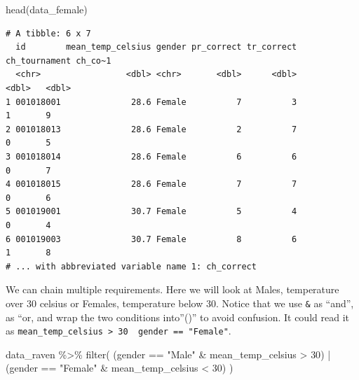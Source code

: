 \documentclass[
  letterpaper,
]{book}
\newenvironment{Shaded}{\begin{snugshade}}{\end{snugshade}}
\newcommand{\DecValTok}[1]{\textcolor[rgb]{0.68,0.00,0.00}{#1}}
\newcommand{\FunctionTok}[1]{\textcolor[rgb]{0.28,0.35,0.67}{#1}}
\newcommand{\NormalTok}[1]{\textcolor[rgb]{0.00,0.23,0.31}{#1}}
\newcommand{\SpecialCharTok}[1]{\textcolor[rgb]{0.37,0.37,0.37}{#1}}
\newcommand{\StringTok}[1]{\textcolor[rgb]{0.13,0.47,0.30}{#1}}
\begin{document}
\begin{Shaded}
\begin{Highlighting}[]
\FunctionTok{head}\NormalTok{(data\_female)}
\end{Highlighting}
\end{Shaded}

\begin{verbatim}
# A tibble: 6 x 7
  id        mean_temp_celsius gender pr_correct tr_correct ch_tournament ch_co~1
  <chr>                 <dbl> <chr>       <dbl>      <dbl>         <dbl>   <dbl>
1 001018001              28.6 Female          7          3             1       9
2 001018013              28.6 Female          2          7             0       5
3 001018014              28.6 Female          6          6             0       7
4 001018015              28.6 Female          7          7             0       6
5 001019001              30.7 Female          5          4             0       4
6 001019003              30.7 Female          8          6             1       8
# ... with abbreviated variable name 1: ch_correct
\end{verbatim}

We can chain multiple requirements. Here we will look at Males,
temperature over 30 celsius or Females, temperature below 30. Notice
that we use \texttt{\&} as ``and'', \texttt{\textbar{}} as ``or, and
wrap the two conditions into''()'' to avoid confusion. It could read it
as
\texttt{mean\_temp\_celsius\ \textgreater{}\ 30\ \textbar{}\ gender\ ==\ "Female"}.

\begin{Shaded}
\begin{Highlighting}[]
\NormalTok{data\_raven }\SpecialCharTok{\%\textgreater{}\%} 
  \FunctionTok{filter}\NormalTok{( }
\NormalTok{    (gender }\SpecialCharTok{==} \StringTok{"Male"} \SpecialCharTok{\&}\NormalTok{ mean\_temp\_celsius }\SpecialCharTok{\textgreater{}} \DecValTok{30}\NormalTok{) }\SpecialCharTok{|}\NormalTok{ (gender }\SpecialCharTok{==} \StringTok{"Female"} \SpecialCharTok{\&}\NormalTok{ mean\_temp\_celsius }\SpecialCharTok{\textless{}} \DecValTok{30}\NormalTok{)}
\NormalTok{        )}
\end{Highlighting}
\end{Shaded}
\end{document}
